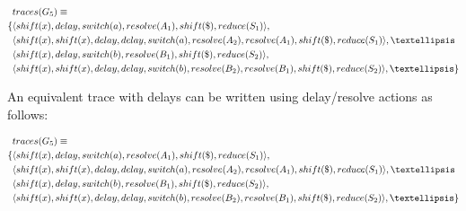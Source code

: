 \documentclass[a4paper,11pt]{article}
\begin{document}
{\small\parbox{.3\textwidth}{\begin{align*}
&traces(G_5) \equiv \\
\{ & \langle shift(x), delay, switch(a), resolve(A_1), shift(\$), reduce(S_1) \rangle,\\
   & \langle shift(x), shift(x), delay, delay, switch(a), resolve(A_2), resolve(A_1), shift(\$), reduce(S_1) \rangle, \textellipsis \\
   & \langle shift(x), delay, switch(b), resolve(B_1), shift(\$), reduce(S_2) \rangle,\\
   & \langle shift(x), shift(x), delay, delay, switch(b), resolve(B_2), resolve(B_1), shift(\$), reduce(S_2) \rangle, \textellipsis \}
\end{align*}}}

An equivalent trace with delays can be written using delay/resolve actions as follows:

{\small\parbox{.3\textwidth}{\begin{align*}
&traces(G_5) \equiv \\
\{ & \langle shift(x), delay, switch(a), resolve(A_1), shift(\$), reduce(S_1) \rangle,\\
   & \langle shift(x), shift(x), delay, delay, switch(a), resolve(A_2), resolve(A_1), shift(\$), reduce(S_1) \rangle, \textellipsis \\
   & \langle shift(x), delay, switch(b), resolve(B_1), shift(\$), reduce(S_2) \rangle,\\
   & \langle shift(x), shift(x), delay, delay, switch(b), resolve(B_2), resolve(B_1), shift(\$), reduce(S_2) \rangle, \textellipsis \}
\end{align*}}}
\end{document}
